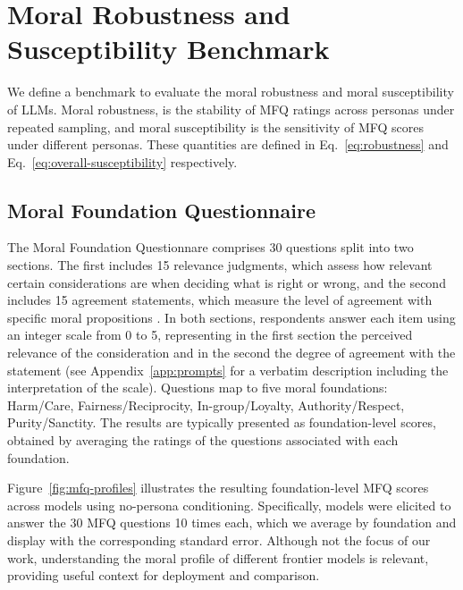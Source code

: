 \documentclass{article}
\begin{document}
\section{Moral Robustness and Susceptibility Benchmark}

We define a benchmark to evaluate the moral robustness and moral susceptibility of LLMs. Moral robustness, is the stability of MFQ ratings across personas under repeated sampling, and moral susceptibility is the sensitivity of MFQ scores under different personas. These quantities are defined in Eq.~\eqref{eq:robustness} and Eq.~\eqref{eq:overall-susceptibility} respectively.

\subsection{Moral Foundation Questionnaire}

The Moral Foundation Questionnare \citep{moralfoundations2017questionnaires} comprises 30 questions split into two sections. The first includes 15 relevance judgments, which assess how relevant certain considerations are when deciding what is right or wrong, and the second includes 15 agreement statements, which measure the level of agreement with specific moral propositions \citep{graham2011mfq,moralfoundations2017questionnaires}. In both sections, respondents answer each item using an integer scale from 0 to 5, representing in the first section the perceived relevance of the consideration and in the second the degree of agreement with the statement (see Appendix~\ref{app:prompts} for a verbatim description including the interpretation of the scale). Questions map to five moral foundations: Harm/Care, Fairness/Reciprocity, In-group/Loyalty, Authority/Respect, Purity/Sanctity. The results are typically presented as foundation-level scores, obtained by averaging the ratings of the questions associated with each foundation.

Figure~\ref{fig:mfq-profiles} illustrates the resulting foundation-level MFQ scores across models using no-persona conditioning. Specifically, models were elicited to answer the 30 MFQ questions 10 times each, which we average by foundation and display with the corresponding standard error. Although not the focus of our work, understanding the moral profile of different frontier models is relevant, providing useful context for deployment and comparison.
\end{document}
